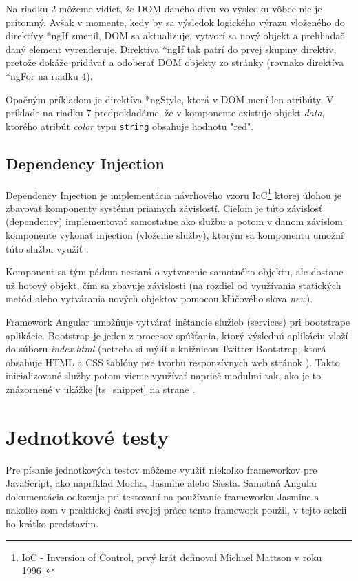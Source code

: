 \documentclass[
  digital, %
  twoside, %
  notable,   %
  nolof,   %
  nolot,   %
]{fithesis3}
\begin{document}
Na riadku 2 môžeme vidieť, že DOM daného divu vo výsledku vôbec nie je prítomný. Avšak v momente, kedy by sa výsledok logického výrazu vloženého do direktívy *ngIf zmenil, DOM sa aktualizuje, vytvorí sa nový objekt a prehliadač daný element vyrenderuje. Direktíva *ngIf tak patrí do prvej skupiny direktív, pretože dokáže pridávať a odoberať DOM objekty zo stránky (rovnako direktíva *ngFor na riadku 4).

Opačným príkladom je direktíva *ngStyle, ktorá v DOM mení len atribúty. V príklade na riadku 7 predpokladáme, že v komponente existuje objekt \textit{data}, ktorého atribút \textit{color} typu \texttt{string} obsahuje hodnotu "red".

\subsection{Dependency Injection}
\label{sec_di}
Dependency Injection je implementácia návrhového vzoru IoC\footnote{IoC - Inversion of Control, prvý krát definoval Michael Mattson v roku 1996~\cite{mattsson1996object}} ktorej úlohou je zbavovať komponenty systému priamych závislostí. Cieľom je túto závislosť (dependency) implementovať samostatne ako službu a potom v danom závislom komponente vykonať injection (vloženie služby), ktorým sa komponentu umožní túto službu využiť \cite{chiba2005aspect, yang2008empirical}.

Komponent sa tým pádom nestará o vytvorenie samotného objektu, ale dostane už hotový objekt, čím sa zbavuje závislosti (na rozdiel od využívania statických metód alebo vytvárania nových objektov pomocou kľúčového slova \textit{new}).

Framework Angular umožňuje vytvárať inštancie služieb (services) pri bootstrape aplikácie. Bootstrap je jeden z procesov spúšťania, ktorý výslednú aplikáciu vloží do súboru \textit{index.html} \cite{angular} (netreba si mýliť s knižnicou Twitter Bootstrap, ktorá obsahuje HTML a CSS šablóny pre tvorbu responzívnych web stránok \cite{peska2017thesis}). Takto inicializované služby potom vieme využívať naprieč modulmi tak, ako je to znázornené v ukážke \ref{ts_snippet} na strane \pageref{ts_snippet}.

\section{Jednotkové testy}
Pre písanie jednotkových testov môžeme využiť niekoľko frameworkov pre JavaScript, ako napríklad Mocha, Jasmine alebo Siesta. Samotná Angular dokumentácia \cite{angular} odkazuje pri testovaní na používanie frameworku Jasmine a nakoľko som v praktickej časti svojej práce tento framework použil, v tejto sekcii ho krátko predstavím.
\end{document}

